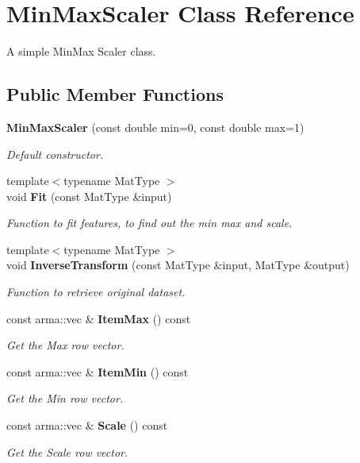 \section{Min\+Max\+Scaler Class Reference}
\label{classmlpack_1_1data_1_1MinMaxScaler}


A simple Min\+Max Scaler class.  


\subsection*{Public Member Functions}
\begin{DoxyCompactItemize}
\item 
\textbf{ Min\+Max\+Scaler} (const double min=0, const double max=1)
\begin{DoxyCompactList}\small\item\em Default constructor. \end{DoxyCompactList}\item 
{\footnotesize template$<$typename Mat\+Type $>$ }\\void \textbf{ Fit} (const Mat\+Type \&input)
\begin{DoxyCompactList}\small\item\em Function to fit features, to find out the min max and scale. \end{DoxyCompactList}\item 
{\footnotesize template$<$typename Mat\+Type $>$ }\\void \textbf{ Inverse\+Transform} (const Mat\+Type \&input, Mat\+Type \&output)
\begin{DoxyCompactList}\small\item\em Function to retrieve original dataset. \end{DoxyCompactList}\item 
const arma\+::vec \& \textbf{ Item\+Max} () const
\begin{DoxyCompactList}\small\item\em Get the Max row vector. \end{DoxyCompactList}\item 
const arma\+::vec \& \textbf{ Item\+Min} () const
\begin{DoxyCompactList}\small\item\em Get the Min row vector. \end{DoxyCompactList}\item 
const arma\+::vec \& \textbf{ Scale} () const
\begin{DoxyCompactList}\small\item\em Get the Scale row vector. \end{DoxyCompactList}\item 

\end{DoxyCompactItemize}
